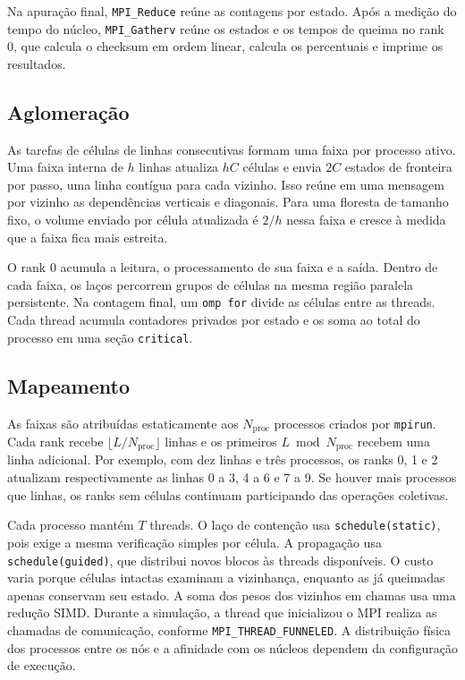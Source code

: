 \documentclass[11pt,a4paper]{article}
\begin{document}
Na apuração final, \texttt{MPI\_Reduce} reúne as contagens por estado.
Após a medição do tempo do núcleo, \texttt{MPI\_Gatherv} reúne os estados
e os tempos de queima no rank 0, que calcula o checksum em ordem linear,
calcula os percentuais e imprime os resultados.

\subsection{Aglomeração}
As tarefas de células de linhas consecutivas formam uma faixa por processo
ativo. Uma faixa interna de $h$ linhas atualiza $hC$ células e envia $2C$
estados de fronteira por passo, uma linha contígua para cada vizinho.
Isso reúne em uma mensagem por vizinho as dependências verticais e diagonais.
Para uma floresta de tamanho fixo, o volume enviado por célula atualizada
é $2/h$ nessa faixa e cresce à medida que a faixa fica mais estreita.

O rank 0 acumula a leitura, o processamento de sua faixa e a saída.
Dentro de cada faixa, os laços percorrem grupos de células na mesma região
paralela persistente. Na contagem final, um \texttt{omp for} divide as células
entre as threads. Cada thread acumula contadores privados por estado e os soma
ao total do processo em uma seção \texttt{critical}.

\subsection{Mapeamento}
As faixas são atribuídas estaticamente aos $N_{\mathrm{proc}}$ processos
criados por \texttt{mpirun}. Cada rank recebe $\lfloor L/N_{\mathrm{proc}}\rfloor$
linhas e os primeiros $L\bmod N_{\mathrm{proc}}$ recebem uma linha adicional.
Por exemplo, com dez linhas e três processos, os ranks 0, 1 e 2 atualizam
respectivamente as linhas 0 a 3, 4 a 6 e 7 a 9. Se houver mais processos que
linhas, os ranks sem células continuam participando das operações coletivas.

Cada processo mantém $T$ threads. O laço de contenção usa
\texttt{schedule(static)}, pois exige a mesma verificação simples por célula.
A propagação usa \texttt{schedule(guided)}, que distribui novos blocos às
threads disponíveis. O custo varia porque células intactas examinam a
vizinhança, enquanto as já queimadas apenas conservam seu estado. A soma
dos pesos dos vizinhos em chamas usa uma redução SIMD. Durante a simulação,
a thread que inicializou o MPI realiza as chamadas de comunicação, conforme
\texttt{MPI\_THREAD\_FUNNELED}. A distribuição física dos processos entre
os nós e a afinidade com os núcleos dependem da configuração de execução.
\end{document}
